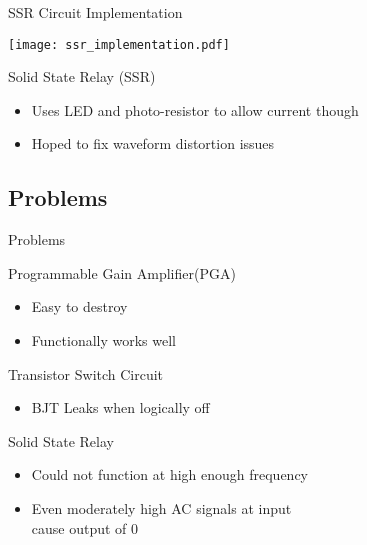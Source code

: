 \begin{frame}{SSR Circuit Implementation}
  \begin{center}
  \texttt{[image: ssr\_implementation.pdf]}
  \end{center}

  \begin{block}{Solid State Relay (SSR)}
  \begin{itemize}
    \item Uses LED and photo-resistor to allow current though
    \item Hoped to fix waveform distortion issues
  \end{itemize}
  \end{block}
\end{frame}

\subsection{Problems}

\begin{frame}{Problems}
  \begin{block}{Programmable Gain Amplifier(PGA)}
  \begin{itemize}
    \item Easy to destroy
    \item Functionally works well
  \end{itemize}
  \end{block}

  \begin{block}{Transistor Switch Circuit}
  \begin{itemize}
    \item BJT Leaks when logically off
  \end{itemize}
  \end{block}

  \begin{block}{Solid State Relay}
  \begin{itemize}
    \item Could not function at high enough frequency
    \item Even moderately high AC signals at input\\ cause output of 0
  \end{itemize}
  \end{block}
\end{frame}

